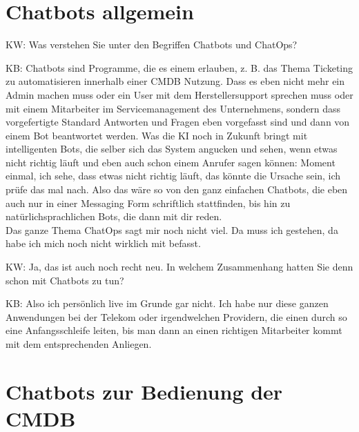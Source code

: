 \section*{Chatbots allgemein}

\begin{list}{X:}{\setlength{\labelsep}{5mm}}
\item[KW:] Was verstehen Sie unter den Begriffen Chatbots und ChatOps?
\item[KB:] Chatbots sind Programme, die es einem erlauben, z. B. das Thema Ticketing zu automatisieren innerhalb einer CMDB Nutzung. Dass es eben nicht mehr ein Admin machen muss oder ein User mit dem Herstellersupport sprechen muss oder mit einem Mitarbeiter im Servicemanagement des Unternehmens, sondern dass vorgefertigte Standard Antworten und Fragen eben vorgefasst sind und dann von einem Bot beantwortet werden. Was die KI noch in Zukunft bringt mit intelligenten Bots, die selber sich das System angucken und sehen, wenn etwas nicht richtig läuft und eben auch schon einem Anrufer sagen können: Moment einmal, ich sehe, dass etwas nicht richtig läuft, das könnte die Ursache sein, ich prüfe das mal nach. Also das wäre so von den ganz einfachen Chatbots, die eben auch nur in einer Messaging Form schriftlich stattfinden, bis hin zu natürlichsprachlichen Bots, die dann mit dir reden.\\ Das ganze Thema ChatOps sagt mir noch nicht viel. Da muss ich gestehen, da habe ich mich noch nicht wirklich mit befasst. 
\item[KW:] Ja, das ist auch noch recht neu. In welchem Zusammenhang hatten Sie denn schon mit Chatbots zu tun?
\item[KB:] Also ich persönlich live im Grunde gar nicht. Ich habe nur diese ganzen Anwendungen bei der Telekom oder irgendwelchen Providern, die einen durch so eine Anfangsschleife leiten, bis man dann an einen richtigen Mitarbeiter kommt mit dem entsprechenden Anliegen.
\end{list}

\section*{Chatbots zur Bedienung der CMDB}

